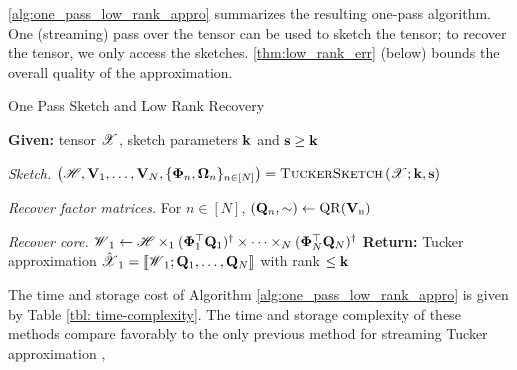 \ref{alg:one_pass_low_rank_appro} summarizes
the resulting one-pass algorithm.
One (streaming) pass over the tensor can be used to sketch the tensor;
to recover the tensor, we only access the sketches.
\ref{thm:low_rank_err} (below) bounds
the overall quality of the approximation.

\begin{algorithm}[H]
  \caption{One Pass Sketch and Low Rank Recovery \label{alg:one_pass_low_rank_appro}}
  \textbf{Given:} tensor $\T{X}$, sketch parameters
  $\mathbf{k}$ and $\mathbf{s} \geq \mathbf{k}$
  \ben
  \item \emph{Sketch.}
  $\left(\T{H}, \mathbf{V}_1, \ldots, \mathbf{V}_N, \{\M{\Phi}_n, \M{\Omega}_n\}_{n \in [N]}\right) =
  \textproc{TuckerSketch}\left(\T{X}; \V{k}, \V{s}\right)$
  \item \emph{Recover factor matrices.} For $n \in [N]$,
  $
  (\mathbf{Q}_n, \sim) \leftarrow \rm{QR}(\mathbf{V}_n)
  $
  \item \emph{Recover core.}
  $
  \T{W}_1 \leftarrow \T{H} \times_1 (\M{\Phi}_1^\top \M{Q}_1)^\dagger \times \cdots \times_N (\M{\Phi}_N^\top \M{Q}_N)^\dagger
  $
  \een
  \textbf{Return:} Tucker approximation
  $\hat{\T{X}}_1 = \llbracket\T{W}_1; \M{Q}_1, \ldots, \M{Q}_N \rrbracket$
  with rank $\leq \mathbf{k}$
\end{algorithm}

The time and storage cost of Algorithm \ref{alg:one_pass_low_rank_appro} is given by Table \ref{tbl: time-complexity}.
The time and storage complexity of these methods compare favorably to the
only previous method for streaming Tucker approximation \cite{malik2018low},

